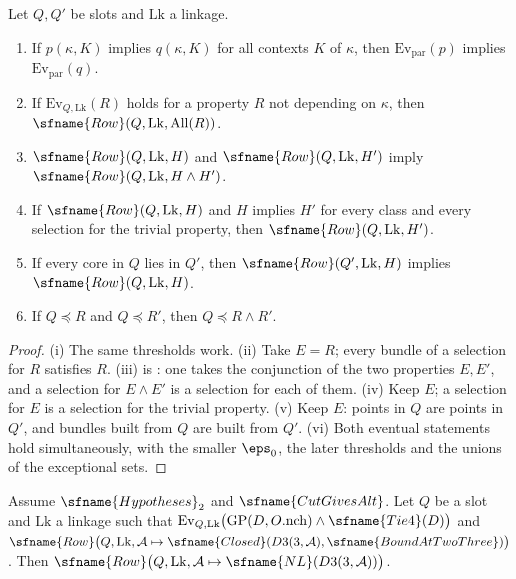 \begin{lemma}\label{pf:linkN:rowcalc}
Let $Q,Q'$ be slots and $\mathrm{Lk}$ a linkage.
\begin{enumerate}[label=(\roman*)]
\item If $p(\kappa,K)$ implies $q(\kappa,K)$ for all contexts $K$ of $\kappa$, then $\mathrm{Ev}_{\mathrm{par}}(p)$ implies $\mathrm{Ev}_{\mathrm{par}}(q)$.
\item If $\mathrm{Ev}_{Q,\mathrm{Lk}}(R)$ holds for a property $R$ not depending on $\kappa$, then $\sfname{Row}(Q,\mathrm{Lk},\mathrm{All}(R))$.
\item $\sfname{Row}(Q,\mathrm{Lk},H)$ and $\sfname{Row}(Q,\mathrm{Lk},H')$ imply $\sfname{Row}(Q,\mathrm{Lk},H\wedge H')$.
\item If $\sfname{Row}(Q,\mathrm{Lk},H)$ and $H$ implies $H'$ for every class and every selection for the trivial property, then
$\sfname{Row}(Q,\mathrm{Lk},H')$.
\item If every core in $Q$ lies in $Q'$, then $\sfname{Row}(Q',\mathrm{Lk},H)$ implies $\sfname{Row}(Q,\mathrm{Lk},H)$.
\item If $Q\preceq R$ and $Q\preceq R'$, then $Q\preceq R\wedge R'$.
\end{enumerate}
\end{lemma}

\begin{proof}
(i) The same thresholds work. (ii) Take $E=R$; every bundle of a selection for $R$ satisfies $R$. (iii) is
: one takes the conjunction of the two properties $E,E'$, and a selection for $E\wedge E'$ is a
selection for each of them. (iv) Keep $E$; a selection for $E$ is a selection for the trivial property. (v) Keep $E$: points in $Q$ are
points in $Q'$, and bundles built from $Q$ are built from $Q'$. (vi) Both eventual statements hold simultaneously, with the smaller
$\eps_0$, the later thresholds and the unions of the exceptional sets.
\end{proof}

\begin{proposition}\label{pf:linkN:slot}
Assume $\sfname{Hypotheses}_2$ and $\sfname{CutGivesAlt}$. Let $Q$ be a slot and $\mathrm{Lk}$ a linkage such that
$\mathrm{Ev}_{Q,\mathrm{Lk}}\bigl(\mathrm{GP}(D,O.\mathrm{nch})\wedge\sfname{Tie4}(D)\bigr)$ and
$\sfname{Row}\bigl(Q,\mathrm{Lk},\mathcal A\mapsto\sfname{Closed}(D3(3,\mathcal A),\sfname{BoundAtTwoThree})\bigr)$. Then
$\sfname{Row}\bigl(Q,\mathrm{Lk},\mathcal A\mapsto\sfname{NL}(D3(3,\mathcal A))\bigr)$.
\end{proposition}

